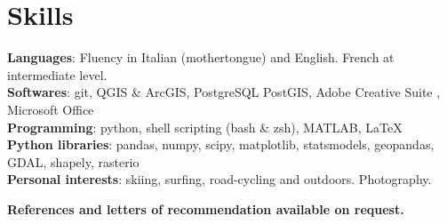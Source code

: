 \documentclass[letterpaper,11pt]{article}
\begin{document}
\section{Skills}
 \begin{itemize}[leftmargin=0.15in, label={}]
    \small{\item{
     \textbf{Languages}{: Fluency in Italian (mothertongue) and English. French at intermediate level.} \\
     \textbf{Softwares}{: git, QGIS \& ArcGIS, PostgreSQL PostGIS, Adobe Creative Suite , \indent Microsoft Office} \\
     \textbf{Programming}{: python, shell scripting (bash \& zsh), MATLAB, \LaTeX} \\
     \textbf{Python libraries}{: pandas, numpy, scipy, matplotlib, statsmodels, geopandas, GDAL, shapely, rasterio}\\
     \textbf{Personal interests}{: skiing, surfing, road-cycling and outdoors. Photography.}\\
}}
 \end{itemize}

\centering
\textbf{References and letters of recommendation available on request.}

\end{document}
